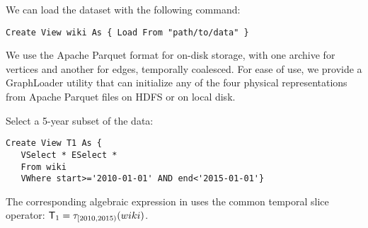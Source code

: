 
\begin{example}
\label{ex:load}


  
We can load the dataset with the following command:

\begin{small} 
\begin{verbatim}
Create View wiki As { Load From "path/to/data" }
\end{verbatim}
\end{small}

\end{example}

We use the Apache Parquet format for on-disk storage, with one archive
for vertices and another for edges, temporally coalesced.  For ease of
use, we provide a GraphLoader utility that can initialize any of the
four physical representations from Apache Parquet files on HDFS or on
local disk.

\begin{example}
\label{ex:slice}

Select a 5-year subset of the data:

\begin{small} 
\begin{verbatim}
Create View T1 As { 
   VSelect * ESelect *
   From wiki
   VWhere start>='2010-01-01' AND end<'2015-01-01'}
\end{verbatim}
\end{small}


The corresponding algebraic expression in \tra uses the common
temporal slice operator: $\mathsf{T}_1 = \tau_{[2010,2015)}(wiki)$.

\end{example}

